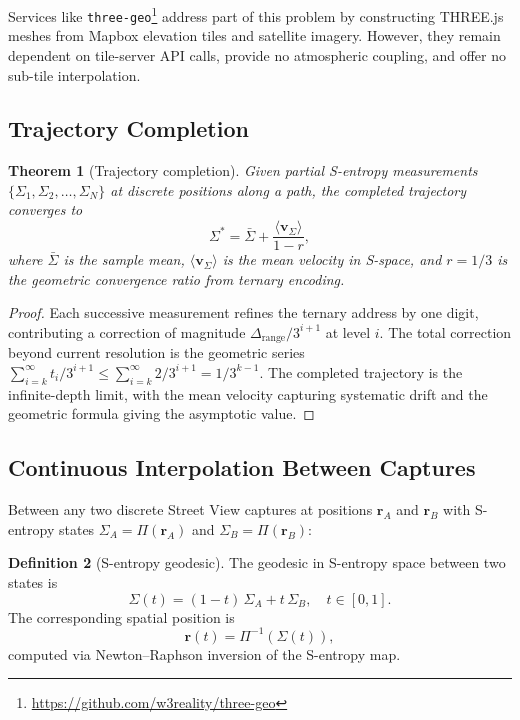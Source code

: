 \documentclass[10pt,twocolumn]{article}
\newtheorem{theorem}{Theorem}[section]
\theoremstyle{definition}
\newtheorem{definition}[theorem]{Definition}
\theoremstyle{remark}
\begin{document}
Services like \texttt{three-geo}\footnote{%
\url{https://github.com/w3reality/three-geo}} address part of
this problem by constructing THREE.js meshes from Mapbox
elevation tiles and satellite imagery.  However, they remain
dependent on tile-server API calls, provide no atmospheric
coupling, and offer no sub-tile interpolation.

\subsection{Trajectory Completion}\label{sec:trajectory}

\begin{theorem}[Trajectory completion]\label{thm:completion}
Given partial S-entropy measurements
$\{\Sigma_1,\Sigma_2,\ldots,\Sigma_N\}$ at discrete positions
along a path, the completed trajectory converges to
\begin{equation}\label{eq:completion}
  \Sigma^* = \bar{\Sigma}
  + \frac{\langle\mathbf{v}_\Sigma\rangle}{1-r},
\end{equation}
where $\bar{\Sigma}$ is the sample mean,
$\langle\mathbf{v}_\Sigma\rangle$ is the mean velocity in
S-space, and $r=1/3$ is the geometric convergence ratio from
ternary encoding.
\end{theorem}

\begin{proof}
Each successive measurement refines the ternary address by one
digit, contributing a correction of magnitude
$\Delta_{\mathrm{range}}/3^{i+1}$ at level $i$.  The total
correction beyond current resolution is the geometric series
$\sum_{i=k}^{\infty}t_i/3^{i+1}\le
\sum_{i=k}^{\infty}2/3^{i+1}=1/3^{k-1}$.
The completed trajectory is the infinite-depth limit, with the
mean velocity capturing systematic drift and the geometric
formula giving the asymptotic value.
\end{proof}

\subsection{Continuous Interpolation Between Captures}
\label{sec:interpolation}

Between any two discrete Street View captures at positions
$\mathbf{r}_A$ and $\mathbf{r}_B$ with S-entropy states
$\Sigma_A=\Pi(\mathbf{r}_A)$ and
$\Sigma_B=\Pi(\mathbf{r}_B)$:

\begin{definition}[S-entropy geodesic]\label{def:geodesic}
The geodesic in S-entropy space between two states is
\begin{equation}\label{eq:geodesic}
  \Sigma(t) = (1-t)\,\Sigma_A + t\,\Sigma_B,
  \quad t\in[0,1].
\end{equation}
The corresponding spatial position is
\begin{equation}\label{eq:spatial_interp}
  \mathbf{r}(t) = \Pi^{-1}(\Sigma(t)),
\end{equation}
computed via Newton--Raphson inversion of the S-entropy map.
\end{definition}
\end{document}
